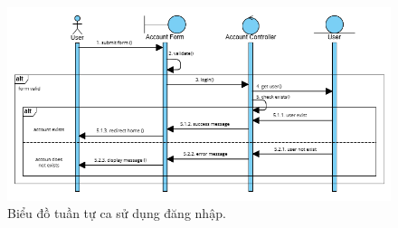 \begin{figure}[H]
    \centering  
    \includegraphics[width=1.1\textwidth]{figures/c3/3-3-1-sequence-diagram.png}
    \caption{Biểu đồ tuần tự ca sử dụng đăng nhập.}
    \label{fig:3-3-1-sequence-diagram}
\end{figure}

